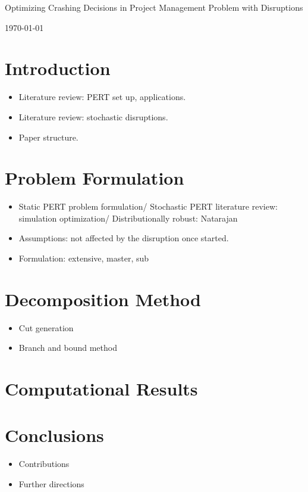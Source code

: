 \documentclass[11pt]{article}
\newcommand{\ms}{\medskip}
\begin{document}
\baselineskip0.25in

\begin{center}
\begin{large}
\begin{bf}

Optimizing Crashing Decisions in Project Management Problem with Disruptions \ms

\today \ms
\end{bf}
\end{large}
\end{center}

\section{Introduction}
	\begin{itemize}
		\item Literature review: PERT set up, applications.
		\item Literature review: stochastic disruptions.
		\item Paper structure.
	\end{itemize}
\section{Problem Formulation}
	\begin{itemize}
		\item Static PERT problem formulation/ Stochastic PERT literature review: simulation optimization/ Distributionally robust: Natarajan
		\item Assumptions: not affected by the disruption once started.
		\item Formulation: extensive, master, sub
	\end{itemize}
\section{Decomposition Method}
	\begin{itemize}
		\item Cut generation
		\item Branch and bound method
	\end{itemize}
\section{Computational Results}
\section{Conclusions}
	\begin{itemize}
		\item Contributions
		\item Further directions
	\end{itemize}



\end{document}
